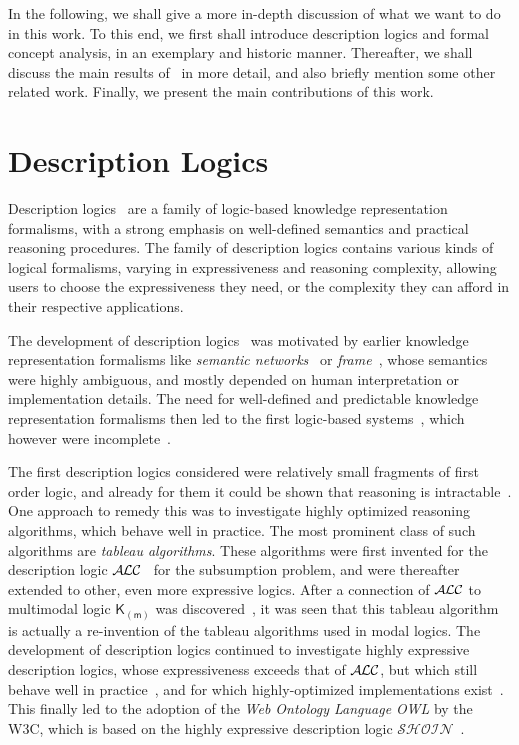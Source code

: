 In the following, we shall give a more in-depth discussion of what we want to do in this
work.  To this end, we first shall introduce description logics and formal concept
analysis, in an exemplary and historic manner.  Thereafter, we shall discuss the main
results of~\cite{Diss-Felix} in more detail, and also briefly mention some other related
work.  Finally, we present the main contributions of this work.

\section{Description Logics}
\label{sec:repr-knowl-using}

Description logics~\cite{DLhandbook} are a family of logic-based knowledge representation
formalisms, with a strong emphasis on well-defined semantics and practical reasoning
procedures.  The family of description logics contains various kinds of logical
formalisms, varying in expressiveness and reasoning complexity, allowing users to choose
the expressiveness they need, or the complexity they can afford in their respective
applications.

The development of description logics~\cite{journals/sLogica/BaaderS01} was motivated by
earlier knowledge representation formalisms like \emph{semantic
  networks}~\cite{SemanticNetworks} or \emph{frame}~\cite{Minsky-Frames}, whose semantics
were highly ambiguous, and mostly depended on human interpretation or implementation
details.  The need for well-defined and predictable knowledge representation formalisms
then led to the first logic-based systems~\cite{journals/cogsci/BrachmanS85}, which
however were incomplete~\cite{conf/kr/Schmidt-Schauss89}.

The first description logics considered were relatively small fragments of first order
logic, and already for them it could be shown that reasoning is
intractable~\cite{conf/aaai/BrachmanL84,journals/ai/Nebel88}.  One approach to remedy this
was to investigate highly optimized reasoning algorithms, which behave well in practice.
The most prominent class of such algorithms are \emph{tableau algorithms}.  These
algorithms were first invented for the description logic
$\mathcal{A}\kern-0.05em\mathcal{L}\mathcal{C}$~\cite{journals/ai/Schmidt-SchaussS91,conf/ecai/HollunderNS90} for the subsumption
problem, and were thereafter extended to other, even more expressive logics.  After a
connection of $\mathcal{A}\kern-0.05em\mathcal{L}\mathcal{C}$ to multimodal logic $\mathsf{K}_{(\mathsf{m})}$ was
discovered~\cite{DBLP:conf/ijcai/Schild91}, it was seen that this tableau algorithm is
actually a re-invention of the tableau algorithms used in modal logics.  The development
of description logics continued to investigate highly expressive description logics, whose
expressiveness exceeds that of $\mathcal{A}\kern-0.05em\mathcal{L}\mathcal{C}$, but which still behave well in
practice~\cite{journals/igpl/HorrocksST00}, and for which highly-optimized implementations
exist~\cite{sirin_pellet:practical_2007,Haarslev:2001,DBLP:conf/cade/TsarkovH06}.  This
finally led to the adoption of the \emph{Web Ontology Language OWL} by the W3C, which is
based on the highly expressive description logic
$\mathcal{S}\mathcal{H}\mathcal{O}\mathcal{I}\mathcal{N}$~\cite{horrocks03fromshiqrdftoowl}.

